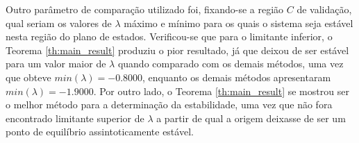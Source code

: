 Outro parâmetro de comparação utilizado foi, fixando-se a região $C$ de validação, qual seriam os valores de $\lambda$ máximo e mínimo para os quais o sistema seja estável nesta região do plano de estados. Verificou-se que para o limitante inferior, o Teorema \ref{th:main_result} produziu o pior resultado, já que deixou de ser estável para um valor maior de $\lambda$ quando comparado com os demais métodos, uma vez que obteve $min(\lambda) = -0.8000$, enquanto os demais métodos apresentaram $min(\lambda) = -1.9000$. Por outro lado, o Teorema \ref{th:main_result} se mostrou ser o melhor método para a determinação da estabilidade, uma vez que não fora encontrado limitante superior de $\lambda$ a partir de qual a origem deixasse de ser um ponto de equilíbrio assintoticamente estável.